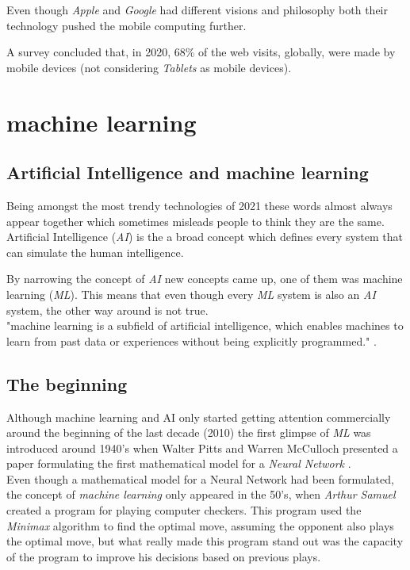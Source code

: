 \documentclass{llncs}
\begin{document}
Even though \emph{Apple} and \emph{Google} had different visions and philosophy both their technology pushed the mobile computing further.

A survey \cite{mobile_usage} concluded that, in 2020, 68\% of the web visits, globally, were made by mobile devices (not considering \emph{Tablets} as mobile devices).\\


\section{machine learning}
\subsection{Artificial Intelligence and machine learning}
Being amongst the most trendy technologies of 2021 \cite{trend_tech} these words almost always appear together which sometimes misleads people to think they are the same.\\

Artificial Intelligence (\emph{AI}) is the a broad concept which defines every system that can simulate the human intelligence.

By narrowing the concept of \emph{AI} new concepts came up, one of them was machine learning (\emph{ML}). This means that even though every \emph{ML} system is also an \emph{AI} system, the other way around is not true.\\

"machine learning is a subfield of artificial intelligence, which enables machines to learn from past data or experiences without being explicitly programmed." \cite{ai_ml_def}.

\subsection{The beginning}

Although machine learning and AI only started getting attention commercially around the beginning of the last decade (2010) the first glimpse of \emph{ML} was introduced around 1940's when Walter Pitts and Warren McCulloch presented a paper formulating the first mathematical model for a \emph{Neural Network} \cite{math_nn}.\\

Even though a mathematical model for a Neural Network had been formulated, the concept of \emph{machine learning} only appeared in the 50's, when \emph{Arthur Samuel} created a program for playing computer checkers. This program used the \emph{Minimax}\cite{minimax} algorithm to find the optimal move, assuming the opponent also plays the optimal move, but what really made this program stand out was the capacity of the program to improve his decisions based on previous plays.\\
\end{document}
